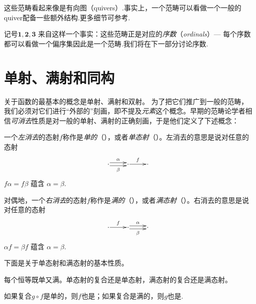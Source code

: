 这些范畴看起来像是有向图（quivers）.事实上，一个范畴可以看做一个一般的quiver配备一些额外结构.更多细节可参考\nlab.

记号$\mathbf{1},\mathbf{2},\mathbf{3}$ 来自这样一个事实：这些范畴正是对应的\emph{序数}（\emph{ordinals}）--- 每个序数都可以看做一个偏序集因此是一个范畴.我们将在下一部分讨论序数.

\section{单射、满射和同构}
关于函数的最基本的概念是单射、满射和双射。
为了把它们推广到一般的范畴，我们必须对它们进行``外部的''刻画，即不提及\emph{元素}这个概念。早期的范畴论学者相信\emph{可消去}性质是对一般的单射、满射的正确刻画，于是他们定义了下述概念：
  \begin{defn}
    一个\emph{左消去}的态射$f$称作是\emph{单的}（），或者\emph{单态射}（）。左消去的意思是说对任意的态射
    \begin{displaymath}
    \xymatrix@1{\cdot\ar@<0.5ex>[r]^{\alpha}\ar@<-0.5ex>[r]_{\beta} &\cdot\ar[r]^{f} &\cdot}
    \end{displaymath}
    $f\alpha=f\beta$ 蕴含 $\alpha=\beta$.

    对偶地，一个\emph{右消去}的态射$f$称作是\emph{满的}（），或者\emph{满态射}（）。右消去的意思是说对任意的态射
    \begin{displaymath}
    \xymatrix@1{\cdot\ar[r]^{f} &\cdot\ar@<0.5ex>[r]^{\alpha}\ar@<-0.5ex>[r]_{\beta} &\cdot}
    \end{displaymath}
    $\alpha f=\beta f$ 蕴含 $\alpha=\beta$.
  \end{defn}

  下面是关于单态射和满态射的基本性质。
  \begin{prop}
    每个恒等既单又满。单态射的复合还是单态射，满态射的复合还是满态射。
  \end{prop}
  \begin{prop}[三角形引理]
    如果复合$g\circ f$是单的，则$f$也是；如果复合是满的，则$g$也是.
  \end{prop}

